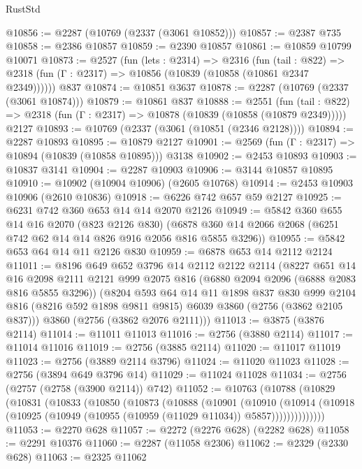 \begin{lexlean}{RustStd}
\begin{coremodule}
@10856 := @2287 (@10769 (@2337 (@3061 @10852)))
@10857 := @2387 @735
@10858 := @2386 @10857
@10859 := @2390 @10857
@10861 := @10859 @10799 @10071
@10873 := @2527
    (fun (lets : @2314) =>
    @2316
      (fun (tail : @822) =>
      @2318 (fun (Γ : @2317) => @10856 (@10839 (@10858 (@10861 @2347 @2349))))))
    @837
@10874 := @10851 @3637
@10878 := @2287 (@10769 (@2337 (@3061 @10874)))
@10879 := @10861 @837
@10888 := @2551
    (fun (tail : @822) => @2318 (fun (Γ : @2317) => @10878 (@10839 (@10858 (@10879 @2349)))))
    @2127
@10893 := @10769 (@2337 (@3061 (@10851 (@2346 @2128))))
@10894 := @2287 @10893
@10895 := @10879 @2127
@10901 := @2569 (fun (Γ : @2317) => @10894 (@10839 (@10858 @10895))) @3138
@10902 := @2453 @10893
@10903 := @10837 @3141
@10904 := @2287 @10903
@10906 := @3144 @10857 @10895
@10910 := @10902 (@10904 @10906) (@2605 @10768)
@10914 := @2453 @10903 @10906 (@2610 @10836)
@10918 := @6226 @742 @657 @59 @2127
@10925 := @6231 @742 @360 @653 @14 @14 @2070 @2126
@10949 := @5842
    @360
    @655
    @14
    @16
    @2070
    (@823 @2126 @830)
    (@6878 @360 @14 @2066 @2068 (@6251 @742 @62 @14 @14 @826 @916 @2056 @816 @5855 @3296))
@10955 := @5842 @653 @64 @14 @11 @2126 @830
@10959 := @6878 @653 @14 @2112 @2124
@11011 := @8196
    @649
    @652
    @3796
    @14
    @2112
    @2122
    @2114
    (@8227
      @651
      @14
      @16
      @2098
      @2111
      @2121
      @999
      @2075
      @816
      (@6880 @2094 @2096 (@6888 @2083 @816 @5855 @3296))
      (@8204
        @593
        @64
        @14
        @11
        @1898
        @837
        @830
        @999
        @2104
        @816
        (@8216 @592 @1898 @9811 @9815)
        @6039
        @3860
        (@2756 (@3862 @2105 @837)))
      @3860
      (@2756 (@3862 @2076 @2111)))
@11013 := @3875 (@3876 @2114)
@11014 := @11011 @11013
@11016 := @2756 (@3880 @2114)
@11017 := @11014 @11016
@11019 := @2756 (@3885 @2114)
@11020 := @11017 @11019
@11023 := @2756 (@3889 @2114 @3796)
@11024 := @11020 @11023
@11028 := @2756 (@3894 @649 @3796 @14)
@11029 := @11024 @11028
@11034 := @2756 (@2757 (@2758 (@3900 @2114)) @742)
@11052 := @10763
    (@10788
      (@10829
        (@10831
          (@10833
            (@10850
              (@10873
                (@10888
                  (@10901
                    (@10910
                      (@10914
                        (@10918 (@10925 (@10949 (@10955 (@10959 (@11029 @11034)) @5857))))))))))))))
@11053 := @2270 @628
@11057 := @2272 (@2276 @628) (@2282 @628)
@11058 := @2291 @10376
@11060 := @2287 (@11058 @2306)
@11062 := @2329 (@2330 @628)
@11063 := @2325 @11062

\end{coremodule}
\end{lexlean}
